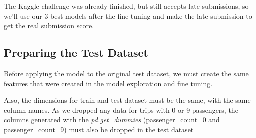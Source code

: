 \documentclass[11pt]{article}
\begin{document}
\hspace{0.5cm}The Kaggle challenge was already finished, but still accepts late
submissions, so we'll use our 3 best models after the fine tuning and
make the late submission to get the real submission score.

\subsection{Preparing the Test Dataset}

\hspace{0.5cm}Before applying the model to the original test dataset, we must create the same features that were created in the model exploration and fine tuning.

Also, the dimensions for train and test dataset must be the same, with the same column names. As we dropped any data for trips with 0 or 9 passengers, the columns generated with the \emph{pd.get\_dummies} (passenger\_count\_0 and passenger\_count\_9) must also be dropped in the test dataset
\end{document}
